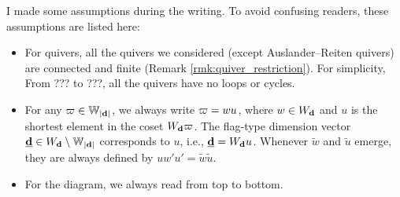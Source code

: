 

\maketitle
\tableofcontents

\begin{warning}
I made some assumptions during the writing. To avoid confusing readers, these assumptions are listed here:
\begin{itemize}
\item For quivers, all the quivers we considered (except Auslander--Reiten quivers) are connected and finite (Remark \ref{rmk:quiver_restriction}). For simplicity, From ??? to ???, all the quivers have no loops or cycles.

\item  For any $\varpi \in \mathbb{W}_{|\mathbf{d}|}$, we always write $\varpi = wu$, where $w \in W_{\mathbf{d}}$ and $u$ is the shortest element in the coset $W_{\mathbf{d}} \varpi$. The flag-type dimension vector $\underline{\mathbf{d}} \in W_{\mathbf{d}} \setminus \mathbb{W}_{|\mathbf{d}|}$ corresponds to $u$, i.e., $\underline{\mathbf{d}}=W_{\mathbf{d}} u$. Whenever $\tilde{w}$ and $\tilde{u}$ emerge, they are always defined by $uw'u'=\tilde{w}\tilde{u}$.

\item For the diagram, we always read from top to bottom.
\end{itemize}
\end{warning}